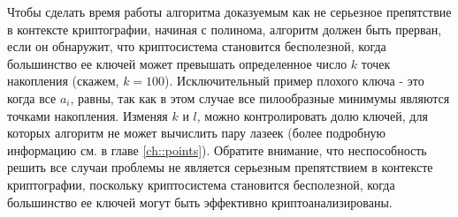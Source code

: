 \documentclass[a4paper,12pt]{report}
\begin{document}
\begin{figure}[h]
\centering
{}
\caption{}\label{fig 3}
\end{figure}

Чтобы сделать время работы алгоритма доказуемым как не серьезное препятствие в контексте криптографии, начиная с полинома, алгоритм должен быть прерван, если он обнаружит, что криптосистема становится бесполезной, когда большинство ее ключей может превышать определенное число $k$ точек накопления (скажем, $k = 100$). Исключительный пример плохого ключа - это когда все $a_i$, равны, так как в этом случае все пилообразные минимумы являются точками накопления. Изменяя $k$ и $l$, можно контролировать долю ключей, для которых алгоритм не может вычислить пару лазеек (более подробную информацию см. в главе \ref{ch::points}). Обратите внимание, что неспособность решить все случаи проблемы не является серьезным препятствием в контексте криптографии, поскольку криптосистема становится бесполезной, когда большинство ее ключей могут быть эффективно криптоанализированы.
\end{document}
